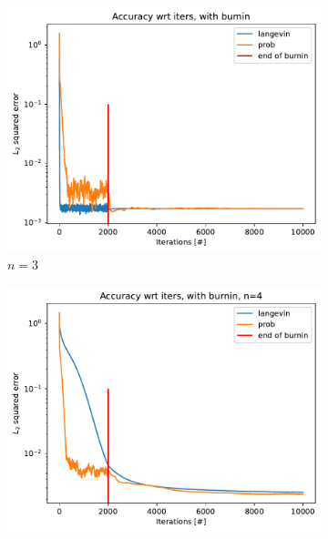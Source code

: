 \documentclass[12pt]{memoir}
\begin{document}
\begin{figure}[H]
    \centering
    \begin{subfigure}[b]{0.49\textwidth}
        \centering
        \includegraphics[width=\textwidth]{figures/experiments/baseline/diff_n_qubits/iters_acc_comp_iters_no_avg-1.png}
        \caption{$n=3$}
        \label{fig:conv-plot-diff-n-3-sub}
    \end{subfigure}
    \hfill
    \begin{subfigure}[b]{0.49\textwidth}
        \centering
        \includegraphics[width=\textwidth]{figures/experiments/baseline/diff_n_qubits/iters_acc_comp_iters_no_avg_n4-1.png}

\end{subfigure}
\end{figure}
\end{document}
